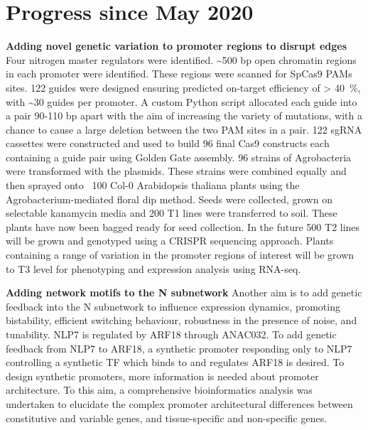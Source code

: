 \documentclass[../main.tex]{subfiles}
\begin{document}
\chapter{Progress since May 2020}\label{progress}

\textbf{Adding novel genetic variation to promoter regions to disrupt edges}
Four nitrogen master regulators were identified. \textasciitilde{}500 bp open chromatin regions in each promoter were identified. These regions were scanned for SpCas9 PAMs sites. 122 guides were designed ensuring predicted on-target efficiency of \textgreater{} \SI{40}{\percent}, with \textasciitilde{}30 guides per promoter. A custom Python script allocated each guide into a pair 90-110 bp apart with the aim of increasing the variety of mutations, with a chance to cause a large deletion between the two PAM sites in a pair. 122 sgRNA cassettes were constructed and used to build 96 final Cas9 constructs each containing a guide pair using Golden Gate assembly. 96 strains of Agrobacteria were transformed with the plasmids. These strains were combined equally and then sprayed onto ~100 Col-0 Arabidopsis thaliana plants using the Agrobacterium-mediated floral dip method. Seeds were collected, grown on selectable kanamycin media and 200 T1 lines were transferred to soil. These plants have now been bagged ready for seed collection. In the future 500 T2 lines will be grown and genotyped using a CRISPR sequencing approach. Plants containing a range of variation in the promoter regions of interest will be grown to T3 level for phenotyping and expression analysis using RNA-seq.

\textbf{Adding network motifs to the N subnetwork}
Another aim is to add genetic feedback into the N subnetwork to influence expression dynamics, promoting bistability, efficient switching behaviour, robustness in the presence of noise, and tunability. NLP7 is regulated by ARF18 through ANAC032. To add genetic feedback from NLP7 to ARF18, a synthetic promoter responding only to NLP7 controlling a synthetic TF which binds to and regulates ARF18 is desired. To design synthetic promoters, more information is needed about promoter architecture. To this aim, a comprehensive bioinformatics analysis was undertaken to elucidate the complex promoter architectural differences between constitutive and variable genes, and tissue-specific and non-specific genes.
\end{document}
